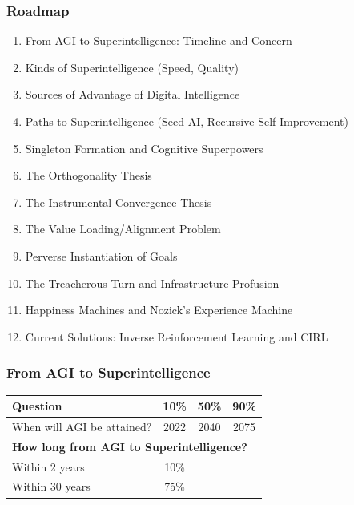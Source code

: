 \subsubsection*{Roadmap}
\begin{enumerate}
  \item From AGI to Superintelligence: Timeline and Concern
  \item Kinds of Superintelligence (Speed, Quality)
  \item Sources of Advantage of Digital Intelligence
  \item Paths to Superintelligence (Seed AI, Recursive Self-Improvement)
  \item Singleton Formation and Cognitive Superpowers
  \item The Orthogonality Thesis
  \item The Instrumental Convergence Thesis
  \item The Value Loading/Alignment Problem
  \item Perverse Instantiation of Goals
  \item The Treacherous Turn and Infrastructure Profusion
  \item Happiness Machines and Nozick's Experience Machine
  \item Current Solutions: Inverse Reinforcement Learning and CIRL
\end{enumerate}

\bigseparator

\subsubsection{From AGI to Superintelligence}

\begin{keybox}
\begin{center}
\renewcommand{\arraystretch}{1.2}
\begin{tabular}{l c c c}
\toprule
\textbf{Question} & \textbf{10\%} & \textbf{50\%} & \textbf{90\%} \\
\midrule
When will AGI be attained? & 2022 & 2040 & 2075 \\
\midrule
\multicolumn{4}{l}{\textbf{How long from AGI to Superintelligence?}} \\
Within 2 years & 10\% & & \\
Within 30 years & 75\% & & \\
\bottomrule
\end{tabular}
\end{center}
\end{keybox}

